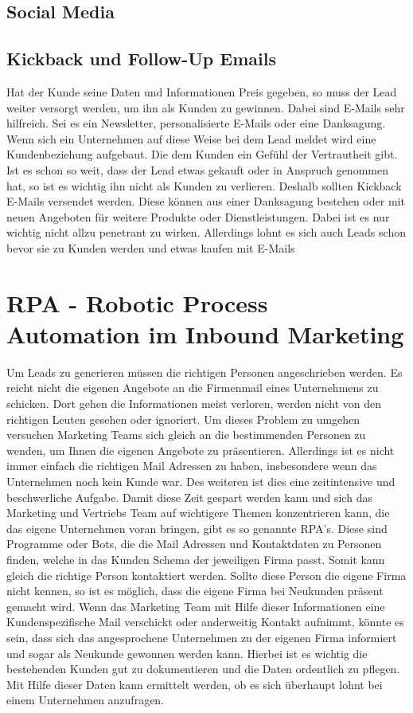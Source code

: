 \subsection{Social Media}



\subsection{Kickback und Follow-Up Emails}
Hat der Kunde seine Daten und Informationen Preis gegeben, so muss der Lead weiter versorgt werden, um ihn als Kunden zu gewinnen. Dabei sind E-Mails sehr hilfreich. Sei es ein Newsletter, personalisierte E-Mails oder eine Danksagung. Wenn sich ein Unternehmen auf diese Weise bei dem Lead meldet wird eine Kundenbeziehung aufgebaut. Die dem Kunden ein Gefühl der Vertrautheit gibt.
\newline
Ist es schon so weit, dass der Lead etwas gekauft oder in Anspruch genommen hat, so ist es wichtig ihn nicht als Kunden zu verlieren. Deshalb sollten Kickback E-Mails versendet werden. Diese können aus einer Danksagung bestehen oder mit neuen Angeboten für weitere Produkte oder Dienstleistungen. Dabei ist es nur wichtig nicht allzu penetrant zu wirken. 
\newline
Allerdings lohnt es sich auch Leads schon bevor sie zu Kunden werden und etwas kaufen mit E-Mails 


\section{RPA - Robotic Process Automation im Inbound Marketing}
Um Leads zu generieren müssen die richtigen Personen angeschrieben werden. Es reicht nicht die eigenen Angebote an die Firmenmail eines Unternehmens zu schicken. Dort gehen die Informationen meist verloren, werden nicht von den richtigen Leuten gesehen oder ignoriert. Um dieses Problem zu umgehen versuchen Marketing Teams sich gleich an die bestimmenden Personen zu wenden, um Ihnen die eigenen Angebote zu präsentieren. Allerdings ist es nicht immer einfach die richtigen Mail Adressen zu haben, insbesondere wenn das Unternehmen noch kein Kunde war. Des weiteren ist dies eine zeitintensive und beschwerliche Aufgabe. 
\newline 
Damit diese Zeit gespart werden kann und sich das Marketing und Vertriebs Team auf wichtigere Themen konzentrieren kann, die das eigene Unternehmen voran bringen, gibt es so genannte RPA's. Diese sind Programme oder Bots, die die Mail Adressen und Kontaktdaten zu Personen finden, welche in das Kunden Schema der jeweiligen Firma passt. Somit kann gleich die richtige Person kontaktiert werden. Sollte diese Person die eigene Firma nicht kennen, so ist es möglich, dass die eigene Firma bei Neukunden präsent gemacht wird. Wenn das Marketing Team mit Hilfe dieser Informationen eine Kundenspezifische Mail verschickt oder anderweitig Kontakt aufnimmt, könnte es sein, dass sich das angesprochene Unternehmen zu der eigenen Firma informiert und sogar als Neukunde gewonnen werden kann. 
\newline 
Hierbei ist es wichtig die bestehenden Kunden gut zu dokumentieren und die Daten ordentlich zu pflegen. Mit Hilfe dieser Daten kann ermittelt werden, ob es sich überhaupt lohnt bei einem Unternehmen anzufragen. 	